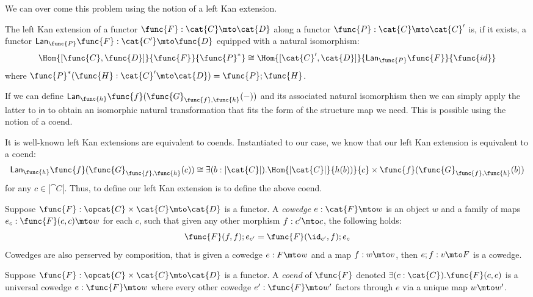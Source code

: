 We can over come this problem using the notion of a left Kan
extension. 
\newcommand{\Lan}[2]{\mathsf{Lan}_{#1}#2}
\begin{definition}
\label{def:left_kan_extension}
The left Kan extension of a functor $\func{F} : \cat{C} \mto \cat{D}$
along a functor $\func{P} : \cat{C} \mto \cat{C}'$ is, if it exists, a
functor $\Lan{\func{P}}{\func{F}} : \cat{C'} \mto \func{D}$ equipped
with a natural isomorphism:
\[
    \Hom{[\func{C},\func{D}]}{\func{F}}{\func{P}^*} \cong \Hom{[\cat{C}',\cat{D}]}{\Lan{\func{P}}{\func{F}}}{\func{id}}
\]
where $\func{P}^*(\func{H} : \cat{C}' \mto \cat{D}) = \func{P};\func{H}$.
\end{definition}
\noindent
If we can define
$\Lan{\func{h}}{\func{f}(\func{G}_{\func{f},\func{h}}(-))}$ and its
associated natural isomorphism then we can simply apply the latter to
$\mathsf{in}$ to obtain an isomorphic natural transformation that fits
the form of the structure map we need. This is possible using the
notion of a coend.

It is well-known left Kan extensions are equivalent to coends.
Instantiated to our case, we know that our left Kan extension is equivalent to a coend:
\[
\begin{array}{lll}
    \Lan{\func{h}}{\func{f}(\func{G}_{\func{f},\func{h}}(c))} 
    \cong \exists(b : |\cat{C}|).\Hom{|\cat{C}|}{h(b))}{c} \times \func{f}(\func{G}_{\func{f},\func{h}}(b))\\    
\end{array}
\]
for any $c \in |\cat{C}|$. Thus, to define our left Kan extension is to define the above coend.  

\begin{definition}[Cowedge]
\label{def:cowedge}
Suppose $\func{F} : \opcat{C} \times \cat{C} \mto \cat{D}$ is a
functor. A \emph{cowedge} $e : \cat{F} \mto w$ is an object $w$ and a
family of maps $e_c : \func{F}(c,c) \mto w$ for each $c$, such that
given any other morphism $f : c' \mto c$, the following holds:
\[
    \func{F}(f,f);e_{c'} = \func{F}(\id_{c'},f);e_{c}
\]
Cowedges are also perserved by composition, that is given a cowedge $e
: F \mto w$ and a map $f : w \mto v$, then $e;f : v \mto F$ is a
cowedge.
\end{definition}

\begin{definition}[Coend]
\label{def:coend}
Suppose $\func{F} : \opcat{C} \times \cat{C} \mto \cat{D}$ is a
functor. A \emph{coend} of $\func{F}$ denoted 
$\exists(c : \cat{C}).\func{F}(c,c)$ 
is a universal cowedge $e : \func{F} \mto w$ where every other cowedge $e' :
\func{F} \mto w'$ factors through $e$ via a unique map $w \mto w'$.
\end{definition}

